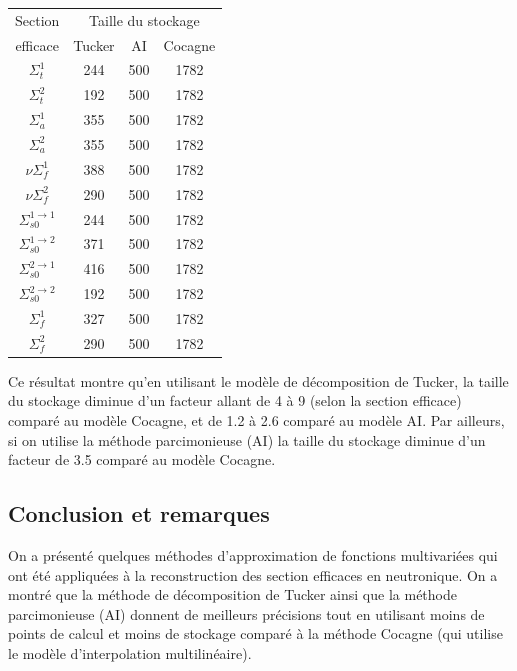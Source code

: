 \begin{center}
\begin{table}[!h]
\begin{tabular}{|*{4}{c|}}
	\hline
	Section              						& \multicolumn{3}{|c|}{Taille du stockage} 		\\
	\cline{2-4}
	efficace				 								& Tucker  			& AI 					 	& Cocagne 		\\
	\hline
	$\Sigma_t^1$ 			 							& 244 						& 500 		 		& 	1782			\\
	\hline
	$\Sigma_t^2$ 			 							& 192 						& 500 		 		& 	1782			\\
	\hline
	$\Sigma_a^1$ 			 							& 355 						& 500 		 		& 	1782			\\
	\hline
	$\Sigma_a^2$ 			 							& 355 						& 500 		 		& 	1782			\\
	\hline
	$\nu \Sigma_f^1$ 			 					& 388 						& 500 		 		& 	1782			\\
	\hline
	$\nu \Sigma_f^2$ 			 					& 290 						& 500 		 		& 	1782			\\
	\hline
	$\Sigma_{s0}^{1\rightarrow1}$ 	& 244 						& 500 		 		& 	1782			\\
	\hline
	$\Sigma_{s0}^{1\rightarrow2}$		& 371 						& 500 		 		& 	1782			\\
	\hline
	$\Sigma_{s0}^{2\rightarrow1}$ 	& 416 						& 500 		 		& 	1782			\\
	\hline
	$\Sigma_{s0}^{2\rightarrow2}$		& 192 						& 500 		 		& 	1782			\\
	\hline
	$\Sigma_f^1$ 			 							& 327 						& 500 		 		& 	1782			\\
	\hline
	$\Sigma_f^2$ 			 							& 290 						& 500 		 		& 	1782			\\
	\hline
\end{tabular}
\label{table:stockage}
\end{table}
\end{center}
Ce résultat montre qu'en utilisant le modèle de décomposition de Tucker, la taille du stockage diminue d'un facteur allant de 4 à 9 (selon la section efficace) comparé au modèle Cocagne, et de 1.2 à 2.6 comparé au modèle AI. Par ailleurs, si on utilise la méthode parcimonieuse (AI) la taille du stockage diminue d'un facteur de 3.5 comparé au modèle Cocagne.

\subsection{Conclusion et remarques}
\hspace{0.5cm} On a présenté quelques méthodes d'approximation de fonctions multivariées qui ont été appliquées à la reconstruction des section efficaces en neutronique. On a montré que la méthode de décomposition de Tucker ainsi que la méthode parcimonieuse (AI) donnent de meilleurs précisions tout en utilisant moins de points de calcul et moins de stockage comparé à la méthode Cocagne (qui utilise le modèle d'interpolation multilinéaire). \\

